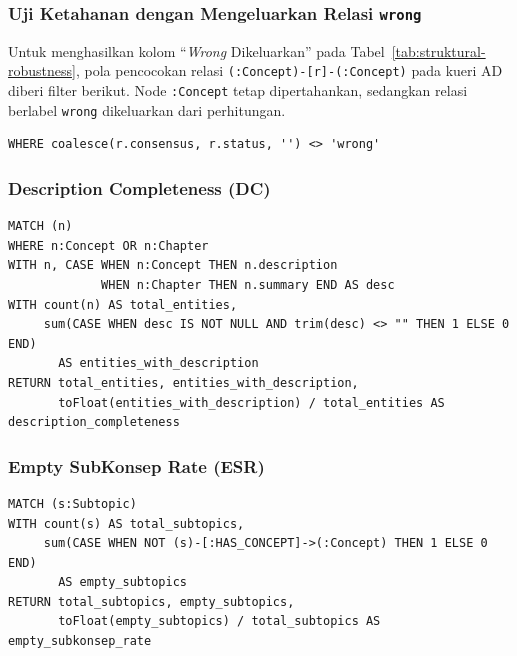 \documentclass[../../thesis]{subfiles}
\begin{document}
\subsubsection{Uji Ketahanan dengan Mengeluarkan Relasi \texttt{wrong}}

Untuk menghasilkan kolom ``\textit{Wrong} Dikeluarkan'' pada
Tabel~\ref{tab:struktural-robustness}, pola pencocokan relasi
\texttt{(:Concept)-[r]-(:Concept)} pada kueri AD diberi filter berikut. Node
\texttt{:Concept} tetap dipertahankan, sedangkan relasi berlabel
\texttt{wrong} dikeluarkan dari perhitungan.

\begin{lstlisting}[style=cypherbox,caption={Filter untuk uji ketahanan metrik struktural tanpa relasi \texttt{wrong}.},label={lst:cypher-drop-wrong}]
WHERE coalesce(r.consensus, r.status, '') <> 'wrong'
\end{lstlisting}

\subsubsection{Description Completeness (DC)}

\begin{lstlisting}[style=cypherbox,caption={DC atas node :Concept (deskripsi) dan :Chapter (ringkasan).},label={lst:cypher-dc}]
MATCH (n)
WHERE n:Concept OR n:Chapter
WITH n, CASE WHEN n:Concept THEN n.description
             WHEN n:Chapter THEN n.summary END AS desc
WITH count(n) AS total_entities,
     sum(CASE WHEN desc IS NOT NULL AND trim(desc) <> "" THEN 1 ELSE 0 END)
       AS entities_with_description
RETURN total_entities, entities_with_description,
       toFloat(entities_with_description) / total_entities AS description_completeness
\end{lstlisting}

\subsubsection{Empty SubKonsep Rate (ESR)}

\begin{lstlisting}[style=cypherbox,caption={ESR: proporsi :Subtopic tanpa anak :Concept.},label={lst:cypher-esr}]
MATCH (s:Subtopic)
WITH count(s) AS total_subtopics,
     sum(CASE WHEN NOT (s)-[:HAS_CONCEPT]->(:Concept) THEN 1 ELSE 0 END)
       AS empty_subtopics
RETURN total_subtopics, empty_subtopics,
       toFloat(empty_subtopics) / total_subtopics AS empty_subkonsep_rate
\end{lstlisting}
\end{document}
